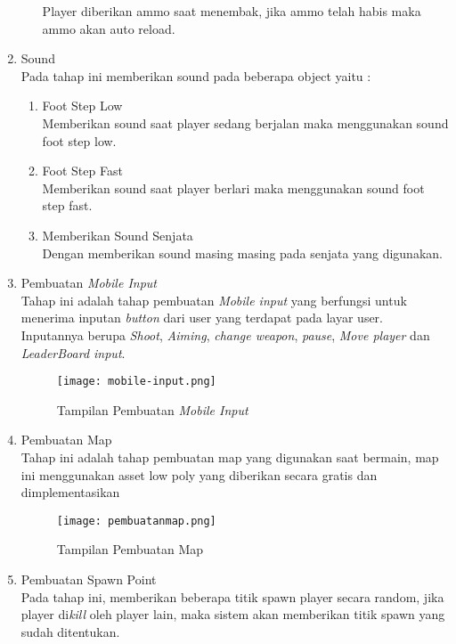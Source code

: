 \begin{enumerate}
\begin{enumerate}
        Player diberikan ammo saat menembak, jika ammo telah habis maka ammo akan auto reload.
    \end{enumerate}
    \item Sound \\
    Pada tahap ini memberikan sound pada beberapa object yaitu :
    \begin{enumerate}
        \item Foot Step Low \\ 
        Memberikan sound saat player sedang berjalan maka menggunakan sound foot step low.
        \item Foot Step Fast \\
        Memberikan sound saat player berlari maka menggunakan sound foot step fast.
        \item Memberikan Sound Senjata \\ 
        Dengan memberikan sound masing masing pada senjata yang digunakan.
    \end{enumerate}
    \item Pembuatan \textit{Mobile Input} \\
    Tahap ini adalah tahap pembuatan \textit{Mobile input} yang berfungsi untuk menerima inputan \textit{button} dari user yang terdapat pada layar user. Inputannya berupa \textit{Shoot}, \textit{Aiming}, \textit{change weapon}, \textit{pause}, \textit{Move player} dan \textit{LeaderBoard input}.
    \newpage
    \begin{figure}[h]
        \centering
        \texttt{[image: mobile-input.png]}
        \caption{Tampilan Pembuatan \textit{Mobile Input}}
        \label{fig:mobileinput}
    \end{figure}
\item Pembuatan Map \\
Tahap ini adalah tahap pembuatan map yang digunakan saat bermain, map ini menggunakan asset low poly yang diberikan secara gratis dan dimplementasikan
\begin{figure}[h]
    \centering
    \texttt{[image: pembuatanmap.png]}
    \caption{Tampilan Pembuatan Map}
    \label{fig:pembuatanmap}
\end{figure}
\newpage
\item Pembuatan Spawn Point \\ 
Pada tahap ini, memberikan beberapa titik spawn player secara random, jika player di\textit{kill} oleh player lain, maka sistem akan memberikan titik spawn yang sudah ditentukan.
\begin{figure}[h]

\end{figure}
\end{enumerate}

